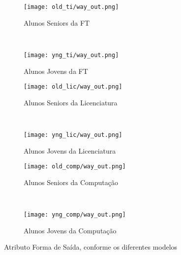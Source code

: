 \clearpage
\begin{figure}[!ht]
    \centering
    \begin{subfigure}[b]{0.48\textwidth}
        \centering
        \texttt{[image: old\_ti/way\_out.png]}
        \caption{Alunos Seniors da FT}
    \end{subfigure}
    ~
    \begin{subfigure}[b]{0.48\textwidth}
        \centering
        \texttt{[image: yng\_ti/way\_out.png]}
        \caption{Alunos Jovens da FT}
    \end{subfigure}

    \begin{subfigure}[b]{0.48\textwidth}
        \centering
        \texttt{[image: old\_lic/way\_out.png]}
        \caption{Alunos Seniors da Licenciatura}
    \end{subfigure}
    ~
    \begin{subfigure}[b]{0.48\textwidth}
        \centering
        \texttt{[image: yng\_lic/way\_out.png]}
        \caption{Alunos Jovens da Licenciatura}
    \end{subfigure}

    \begin{subfigure}[b]{0.48\textwidth}
        \centering
        \texttt{[image: old\_comp/way\_out.png]}
        \caption{Alunos Seniors da Computação}
    \end{subfigure}
    ~
    \begin{subfigure}[b]{0.48\textwidth}
        \centering
        \texttt{[image: yng\_comp/way\_out.png]}
        \caption{Alunos Jovens da Computação}
    \end{subfigure}
    \caption{Atributo Forma de Saída, conforme os diferentes modelos}
\end{figure}


